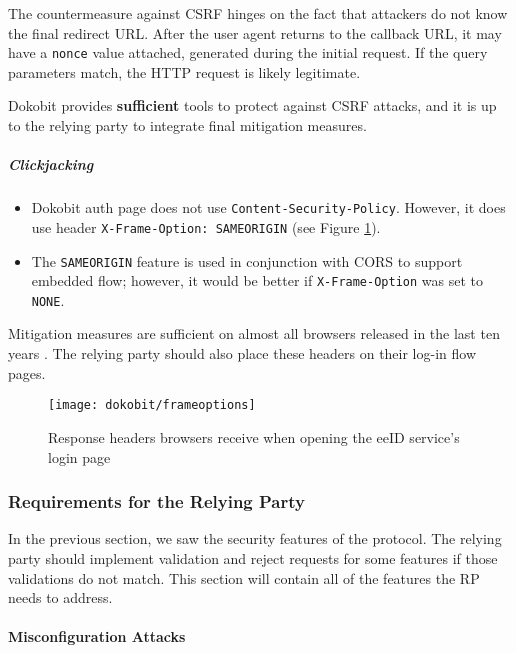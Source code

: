 The countermeasure against CSRF hinges on the fact that attackers do not know the final redirect URL. After the user agent returns to the callback URL, it may have a \texttt{nonce} value attached, generated during the initial request. If the query parameters match, the HTTP request is likely legitimate.

Dokobit provides \textbf{sufficient} tools to protect against CSRF attacks, and it is up to the relying party to integrate final mitigation measures.

\subparagraph{Clickjacking}

\begin{itemize}
  \item Dokobit auth page does not use \texttt{Content-Security-Policy}. However, it does use header \texttt{X-Frame-Option: {SAMEORIGIN}} (see Figure \ref{fig:dokobit-responseheaders}).
  \item The \texttt{SAMEORIGIN} feature is used in conjunction with CORS to support embedded flow; however, it would be better if \texttt{X-Frame-Option} was set to \texttt{NONE}.
\end{itemize}

Mitigation measures are sufficient on almost all browsers released in the last ten years \cite{caniuse-xframeoptions}. The relying party should also place these headers on their log-in flow pages.

\begin{figure}
  \centering
  \texttt{[image: dokobit/frameoptions]}
  \caption{Response headers browsers receive when opening the eeID service's login page}
  \label{fig:dokobit-responseheaders}
\end{figure}

\subsubsection{Requirements for the Relying Party}

In the previous section, we saw the security features of the protocol. The relying party should implement validation and reject requests for some features if those validations do not match. This section will contain all of the features the RP needs to address.
\vspace*{3cm}

\paragraph{Misconfiguration Attacks}

